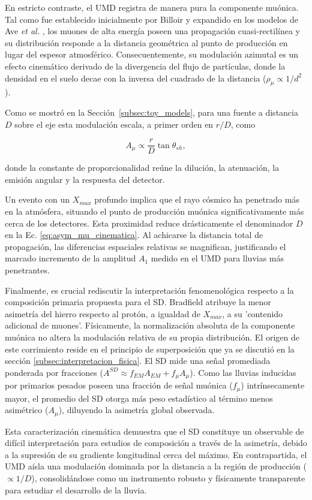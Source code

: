 En estricto contraste, el UMD registra de manera pura la componente muónica. Tal como fue establecido inicialmente por Billoir \cite{GAP2000_017} y expandido en los modelos de Ave \textit{et al.} \cite{ave2017}, los muones de alta energía poseen una propagación cuasi-rectilínea y su distribución responde a la distancia geométrica al punto de producción en lugar del espesor atmosférico. Consecuentemente, su modulación azimutal es un efecto cinemático derivado de la divergencia del flujo de partículas, donde la densidad en el suelo decae con la inversa del cuadrado de la distancia ($\rho_\mu \propto 1/d^2$). 

Como se mostró en la Sección~\ref{subsec:toy_models}, para una fuente a distancia $D$ sobre el eje esta modulación escala, a primer orden en $r/D$, como

\begin{equation}
	A_{\mu} \propto \frac{r}{D}\tan\theta_{sh},
	\label{eq:asym_mu_cinematica}
\end{equation}

donde la constante de proporcionalidad reúne la dilución, la atenuación, la emisión angular y la respuesta del detector.

Un evento con un $X_{max}$ profundo implica que el rayo cósmico ha penetrado más en la atmósfera, situando el punto de producción muónica significativamente más cerca de los detectores. Esta proximidad reduce drásticamente el denominador $D$ en la Ec. \ref{eq:asym_mu_cinematica}. Al achicarse la distancia total de propagación, las diferencias espaciales relativas se magnifican, justificando el marcado incremento de la amplitud $A_1$ medido en el UMD para lluvias más penetrantes.

Finalmente, es crucial rediscutir la interpretación fenomenológica respecto a la composición primaria propuesta para el SD. Bradfield atribuye la menor asimetría del hierro respecto al protón, a igualdad de $X_{max}$, a su 'contenido adicional de muones'. Físicamente, la normalización absoluta de la componente muónica no altera la modulación relativa de su propia distribución. El origen de este corrimiento reside en el principio de superposición que ya se discutió en la sección \ref{subsec:interpretacion_fisica}. El SD mide una señal promediada ponderada por fracciones ($A^{SD} \approx f_{EM} A_{EM} + f_{\mu} A_{\mu}$). Como las lluvias inducidas por primarios pesados poseen una fracción de señal muónica ($f_{\mu}$) intrínsecamente mayor, el promedio del SD otorga más peso estadístico al término menos asimétrico ($A_{\mu}$), diluyendo la asimetría global observada. 

Esta caracterización cinemática demuestra que el SD constituye un observable de difícil interpretación para estudios de composición a través de la asimetría, debido a la supresión de su gradiente longitudinal cerca del máximo. En contrapartida, el UMD aísla una modulación dominada por la distancia a la región de producción ($\propto 1/D$), consolidándose como un instrumento robusto y físicamente transparente para estudiar el desarrollo de la lluvia.

\newpage